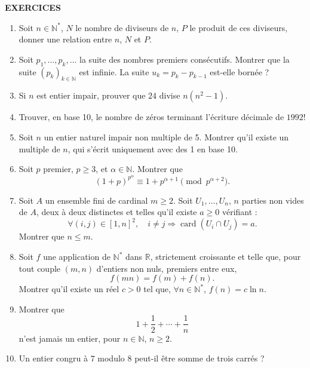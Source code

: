 \clearpage
{}
{}
\begin{center}
{\Large\sffamily\bfseries\color{BellaLavenderDeep} EXERCICES}
\end{center}
\vspace{0.8em}

\begin{enumerate}[label=\arabic*.,leftmargin=2.2em,itemsep=1.0em]
\item Soit $n\in\mathbb N^*$, $N$ le nombre de diviseurs de $n$, $P$ le produit de ces diviseurs, donner une relation entre $n$, $N$ et $P$.

\item Soit $p_1,\ldots,p_k,\ldots$ la suite des nombres premiers consécutifs. Montrer que la suite $(p_k)_{k\in\mathbb N}$ est infinie. La suite $u_k=p_k-p_{k-1}$ est-elle bornée ?

\item Si $n$ est entier impair, prouver que $24$ divise $n(n^2-1)$.

\item Trouver, en base 10, le nombre de zéros terminant l'écriture décimale de $1992!$

\item Soit $n$ un entier naturel impair non multiple de 5. Montrer qu'il existe un multiple de $n$, qui s'écrit uniquement avec des 1 en base 10.

\item Soit $p$ premier, $p\ge3$, et $\alpha\in\mathbb N$. Montrer que
\[
(1+p)^{p^\alpha}\equiv1+p^{\alpha+1}\pmod{p^{\alpha+2}}.
\]

\item Soit $A$ un ensemble fini de cardinal $m\ge2$. Soit $U_1,\ldots,U_n$, $n$ parties non vides de $A$, deux à deux distinctes et telles qu'il existe $a\ge0$ vérifiant :
\[
\forall(i,j)\in[1,n]^2,\quad i\ne j\Rightarrow\operatorname{card}(U_i\cap U_j)=a.
\]
Montrer que $n\le m$.

\item Soit $f$ une application de $\mathbb N^*$ dans $\mathbb R$, strictement croissante et telle que, pour tout couple $(m,n)$ d'entiers non nuls, premiers entre eux,
\[
f(mn)=f(m)+f(n).
\]
Montrer qu'il existe un réel $c>0$ tel que, $\forall n\in\mathbb N^*$, $f(n)=c\ln n$.

\item Montrer que
\[
1+\frac12+\cdots+\frac1n
\]
n'est jamais un entier, pour $n\in\mathbb N$, $n\ge2$.

\item Un entier congru à $7$ modulo $8$ peut-il être somme de trois carrés ?
\end{enumerate}

